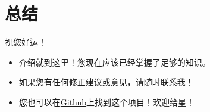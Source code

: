 \section{总结}

\begin{frame}{祝您好运！}
	\begin{itemize}
		\item 介绍就到这里！您现在应该已经掌握了足够的知识。
		\item 如果您有任何修正建议或意见，请随时\href{mailto:shiyi.liu@connect.ust.hk}{联系我}！
        \item 您也可以在\href{https://github.com/andy-shiyi-liu/HKUST-Beamer-Template}{Github}上找到这个项目！欢迎给星！
	\end{itemize}
\end{frame}